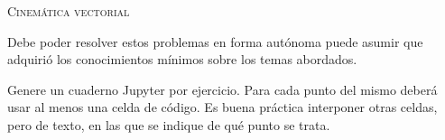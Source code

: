 \documentclass[11pt, a4paper, twoside]{article}
\begin{document}
\begin{center}
	\textsc{\large Cinemática vectorial}
\end{center}
Debe poder resolver estos problemas en forma autónoma puede asumir que adquirió los conocimientos mínimos sobre los temas abordados.


\noindent
Genere un cuaderno Jupyter por ejercicio.
Para cada punto del mismo deberá usar al menos una celda de código.
Es buena práctica interponer otras celdas, pero de texto, en las que se indique de qué punto se trata.
 
\begin{enumerate}
	

\end{enumerate}
\end{document}
